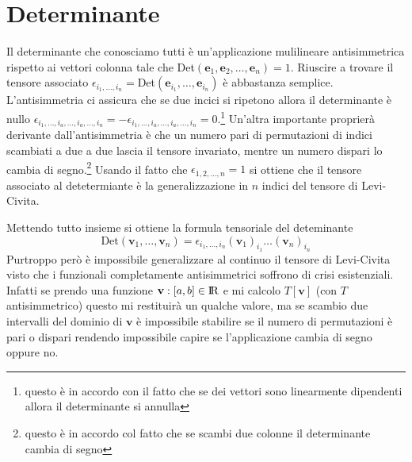 \documentclass[11pt,a4paper]{report}
\newcommand{\vettore}[1]{\mathbf{#1}}
\theoremstyle{definition}
\theoremstyle{plain}
\theoremstyle{plain}
\begin{document}
		\section{Determinante}
		\label{sec:det}
			Il determinante che conosciamo tutti è un'applicazione mulilineare antisimmetrica rispetto ai vettori colonna tale che Det$(\vettore e_1,\vettore e_2,\dots,\vettore e_n)=1$.\newline
			Riuscire a trovare il tensore associato $\epsilon_{i_1,\dots,i_n}=$Det$(\vettore e_{i_1},\dots,\vettore e_{i_n})$ è abbastanza semplice.\newline
			L'antisimmetria ci assicura che se due incici si ripetono allora il determinante è nullo $\epsilon_{i_1,\dots,i_a,\dots,i_a,\dots,i_n}=-\epsilon_{i_1,\dots,i_a,\dots,i_a,\dots,i_n}=0$.\footnote{questo è in accordo con il fatto che se dei vettori sono linearmente dipendenti allora il determinante si annulla}\newline
			Un'altra importante proprierà derivante dall'antisimmetria è che un numero pari di permutazioni di indici scambiati a due a due lascia il tensore invariato, mentre un numero dispari lo cambia di segno.\footnote{questo è in accordo col fatto che se scambi due colonne il determinante cambia di segno}\newline
			Usando il fatto che $\epsilon_{1,2,\dots,n}=1$ si ottiene che il tensore associato al detetermiante è la generalizzazione in $n$ indici del tensore di Levi-Civita.\newline

			Mettendo tutto insieme si ottiene la formula tensoriale del deteminante
			\begin{equation}
				\textrm{Det}(\vettore v_1,\dots,\vettore v_n)=\epsilon_{i_1,\dots,i_n}(\vettore v_1)_{i_1}\dots (\vettore v_n)_{i_n}
			\end{equation}
			Purtroppo però è impossibile generalizzare al continuo il tensore di Levi-Civita visto che i funzionali completamente antisimmetrici soffrono di crisi esistenziali.\newline
			Infatti se prendo una funzione $\vettore v:[a,b]\in\rm I\!R$ e mi calcolo $T[\vettore v]$ (con $T$ antisimmetrico) questo mi restituirà un qualche valore, ma se scambio due intervalli del dominio di $\vettore v$ è impossibile stabilire se il numero di permutazioni è pari o dispari rendendo impossibile capire se l'applicazione cambia di segno oppure no.
\end{document}
